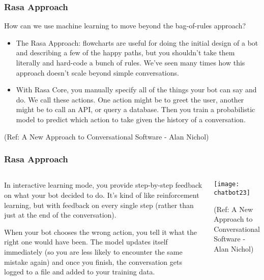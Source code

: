  \begin{frame}[fragile]\frametitle{Rasa Approach}
 
 How can we use machine learning to move beyond the bag-of-rules approach?
 
\begin{itemize}
\item The Rasa Approach: flowcharts are useful for doing the initial design of a bot and describing a few of the happy paths, but you shouldn't take them literally and hard-code a bunch of rules. We've seen many times how this approach doesn't scale beyond simple conversations.
\item With Rasa Core, you manually specify all of the things your bot can say and do. We call these actions. One action might be to greet the user, another might be to call an API, or query a database. Then you train a probabilistic model to predict which action to take given the history of a conversation.
\end{itemize}

{\tiny (Ref: A New Approach to Conversational Software - Alan Nichol)}


\end{frame}

 \begin{frame}[fragile]\frametitle{Rasa Approach}
 
\begin{columns}
\begin{column}[T]{0.5\linewidth}

In interactive learning mode, you provide step-by-step feedback on what your bot decided to do. It's kind of like reinforcement learning, but with feedback on every single step (rather than just at the end of the conversation).

When your bot chooses the wrong action, you tell it what the right one would have been. The model updates itself immediately (so you are less likely to encounter the same mistake again) and once you finish, the conversation gets logged to a file and added to your training data.
\end{column}
\begin{column}[T]{0.5\linewidth}

\begin{center}
\texttt{[image: chatbot23]}

\end{center}

{\tiny (Ref: A New Approach to Conversational Software - Alan Nichol)}

\end{column}
\end{columns}
\end{frame}

